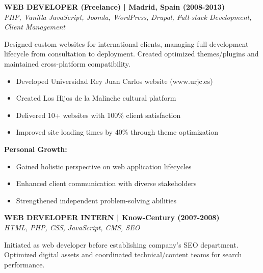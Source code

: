 \documentclass[a4paper,10pt]{article}
\begin{document}
{\begin{minipage}{\dimexpr\textwidth-2\fboxsep\relax}
		\noindent\textbf{WEB DEVELOPER (Freelance) | Madrid, Spain (2008-2013)} \\
		\vspace{0.1cm}
		{\small\textit{PHP, Vanilla JavaScript, Joomla, WordPress, Drupal, Full-stack Development, Client Management}}
		\vspace{0.2cm}

		Designed custom websites for international clients, managing full development lifecycle from consultation to deployment. Created optimized themes/plugins and maintained cross-platform compatibility.

		\vspace{0.2cm}
		\begin{itemize}[label=\textcolor{darkblue}{\textbullet}, leftmargin=*, nosep]
			\item Developed Universidad Rey Juan Carlos website (www.urjc.es)
			\item Created Los Hijos de la Malinche cultural platform
			\item Delivered 10+ websites with 100\% client satisfaction
			\item Improved site loading times by 40\% through theme optimization
		\end{itemize}

		\vspace{0.2cm}
		\textbf{Personal Growth:}
		\vspace{0.2cm}
		\begin{itemize}[label=\textcolor{darkblue}{\textbullet}, leftmargin=*, nosep]
			\item Gained holistic perspective on web application lifecycles
			\item Enhanced client communication with diverse stakeholders
			\item Strengthened independent problem-solving abilities
		\end{itemize}

		\vspace{0.4cm}

		\noindent\textbf{WEB DEVELOPER INTERN | Know-Century (2007-2008)} \\
		\vspace{0.1cm}
		{\small\textit{HTML, PHP, CSS, JavaScript, CMS, SEO}}
		\vspace{0.2cm}

		Initiated as web developer before establishing company's SEO department. Optimized digital assets and coordinated technical/content teams for search performance.


\end{minipage}}
\end{document}
